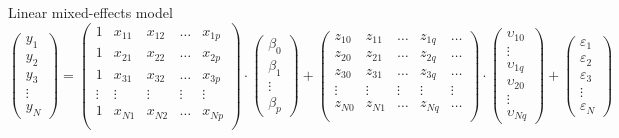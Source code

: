 \documentclass{beamer}
\begin{document}
\begin{frame}[shrink=25]{Linear mixed-effects model}
\vspace{2cm}
\begin{equation*}
  \begin{pmatrix}
    y_1 \\
    y_2 \\
    y_3 \\
    \vdots \\
    y_N
  \end{pmatrix} = 
  \begin{pmatrix}
    1 & x_{11} & x_{12} & \dots & x_{1p} \\
    1 & x_{21} & x_{22} & \dots & x_{2p} \\
    1 & x_{31} & x_{32} & \dots & x_{3p} \\
    \vdots & \vdots & \vdots & \vdots & \vdots \\
    1 & x_{N1} & x_{N2} & \dots & x_{Np} \\
  \end{pmatrix} \cdot
  \begin{pmatrix}
    \beta_0 \\
    \beta_1 \\
    \vdots \\
    \beta_p
  \end{pmatrix} +
  \begin{pmatrix}
    z_{10} & z_{11} & \dots & z_{1q} & \dots \\
    z_{20} & z_{21} & \dots & z_{2q} & \dots \\
    z_{30} & z_{31} & \dots & z_{3q} & \dots \\
    \vdots & \vdots & \vdots & \vdots & \vdots \\
    z_{N0} & z_{N1} & \dots & z_{Nq} & \dots \\
  \end{pmatrix} \cdot
  \begin{pmatrix}
    \upsilon_{10} \\
    \vdots \\
    \upsilon_{1q}\\
    \upsilon_{20} \\
    \vdots \\
    \upsilon_{Nq}
  \end{pmatrix} + 
  \begin{pmatrix}
    \varepsilon_1 \\
    \varepsilon_2 \\
    \varepsilon_3 \\
    \vdots \\
    \varepsilon_N
  \end{pmatrix}
\end{equation*}
\end{frame}
\end{document}

